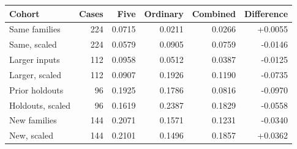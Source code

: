 \begin{tabular}{lrrrrr}
\toprule
Cohort & Cases & Five & Ordinary & Combined & Difference\\
\midrule
Same families & 224 & 0.0715 & 0.0211 & 0.0266 & +0.0055\\
Same, scaled & 224 & 0.0579 & 0.0905 & 0.0759 & -0.0146\\
Larger inputs & 112 & 0.0958 & 0.0512 & 0.0387 & -0.0125\\
Larger, scaled & 112 & 0.0907 & 0.1926 & 0.1190 & -0.0735\\
Prior holdouts & 96 & 0.1925 & 0.1786 & 0.0816 & -0.0970\\
Holdouts, scaled & 96 & 0.1619 & 0.2387 & 0.1829 & -0.0558\\
New families & 144 & 0.2071 & 0.1571 & 0.1231 & -0.0340\\
New, scaled & 144 & 0.2101 & 0.1496 & 0.1857 & +0.0362\\
\bottomrule
\end{tabular}
